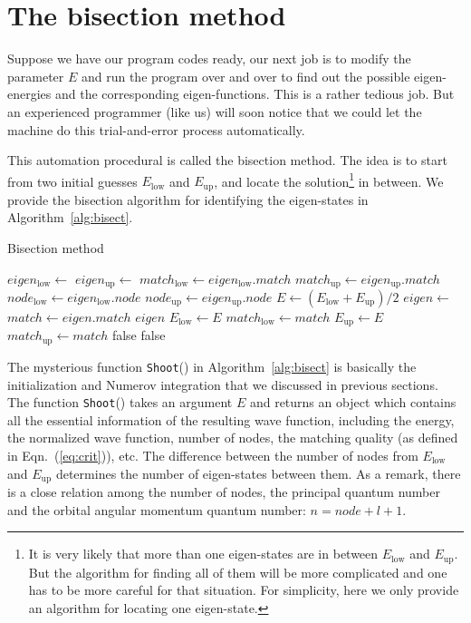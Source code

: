 \section{The bisection method}
Suppose we have our program codes ready, our next job is to modify the parameter
$E$ and run the program over and over to find out the possible eigen-energies and
the corresponding eigen-functions. This is a rather tedious job. But an experienced
programmer (like us) will soon notice that we could let the machine do this trial-and-error
process automatically.

This automation procedural is called the bisection method. The idea is to start
from two initial guesses $E_{\text{low}}$ and $E_{\text{up}}$, and locate the
solution\footnote{It is very likely that more than one eigen-states are in
between $E_{\text{low}}$ and $E_{\text{up}}$. But the algorithm for finding all of them will
be more complicated and one has to be more careful for that situation. For
simplicity, here we only provide an algorithm for locating one eigen-state.}
in between. We provide the bisection algorithm for identifying the
eigen-states in Algorithm~\ref{alg:bisect}.

\begin{algorithm}[h!]
\caption{Bisection method}\label{alg:bisect}
\begin{algorithmic}[1]
\State $eigen_{\text{low}} \gets$ 
\State $eigen_{\text{up}} \gets$ 
\State $match_{\text{low}} \gets eigen_{\text{low}}.match$
\State $match_{\text{up}} \gets eigen_{\text{up}}.match$
\State $node_{\text{low}} \gets eigen_{\text{low}}.node$
\State $node_{\text{up}} \gets eigen_{\text{up}}.node$
\Loop
\State $E \gets (E_{\text{low}}+E_{\text{up}})/2$
\State $eigen \gets$ 
\State $match \gets eigen.match$
 
\State \Return $eigen$
\Else
{}
\State $E_{\text{low}} \gets E$
\State $match_{\text{low}} \gets match$
\State $E_{\text{up}} \gets E$
\State $match_{\text{up}} \gets match$
\Else
\State \Return false
\EndIf
\EndIf
\EndLoop
\Else
\State \Return false
\EndIf
\EndFunction
\end{algorithmic}
\end{algorithm}

The mysterious function \texttt{Shoot}() in Algorithm~\ref{alg:bisect} is
basically the initialization and Numerov integration that we discussed in
previous sections. The function \texttt{Shoot}() takes an argument $E$ and
returns an object which contains all the essential information of the resulting
wave function, including the energy, the normalized wave function, number
of nodes, the matching quality (as defined
in Eqn.~(\ref{eq:crit})), etc. The difference between the number of nodes
from $E_{\text{low}}$ and $E_{\text{up}}$ determines the number of
eigen-states between them. As a remark, there is a close relation among
the number of nodes, the principal quantum number and the orbital angular
momentum quantum number: $n = node + l + 1$.

